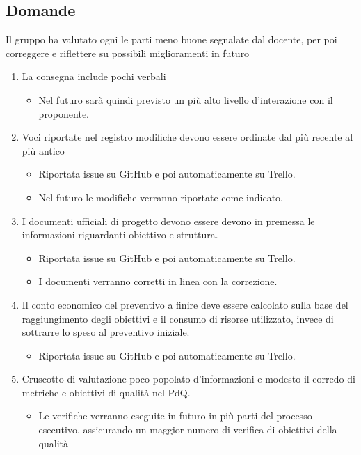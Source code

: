 \subsection{Domande}
Il gruppo ha valutato ogni le parti meno buone segnalate dal docente, per poi correggere e riflettere su 
possibili miglioramenti in futuro
\begin{enumerate}
	\item La consegna include pochi verbali
	\begin{itemize}
		\item Nel futuro sarà quindi previsto un più alto livello d'interazione con 
			  il proponente.
	\end{itemize}
	\item Voci riportate nel registro modifiche devono essere ordinate dal più recente al più antico
	\begin{itemize}
		\item Riportata issue su GitHub e poi automaticamente su Trello.
		\item Nel futuro le modifiche verranno riportate come indicato. 
	\end{itemize}
	\item I documenti ufficiali di progetto devono essere devono in premessa le informazioni riguardanti
		  obiettivo e struttura.
	\begin{itemize}
		\item Riportata issue su GitHub e poi automaticamente su Trello.
		\item I documenti verranno corretti in linea con la correzione.
	\end{itemize}
	\item Il conto economico del preventivo a finire deve essere calcolato sulla base del raggiungimento
		  degli obiettivi e il consumo di risorse utilizzato, invece di sottrarre lo speso al preventivo iniziale.
	\begin{itemize}
		\item Riportata issue su GitHub e poi automaticamente su Trello.
	\end{itemize}	
	\item Cruscotto di valutazione poco popolato d'informazioni e modesto il corredo di 
		  metriche e obiettivi di qualità nel PdQ.
	\begin{itemize}
    	\item Le verifiche verranno eseguite in futuro in più parti del processo esecutivo,
			  assicurando un maggior numero di verifica di obiettivi della qualità
	\end{itemize}	
\end{enumerate}
